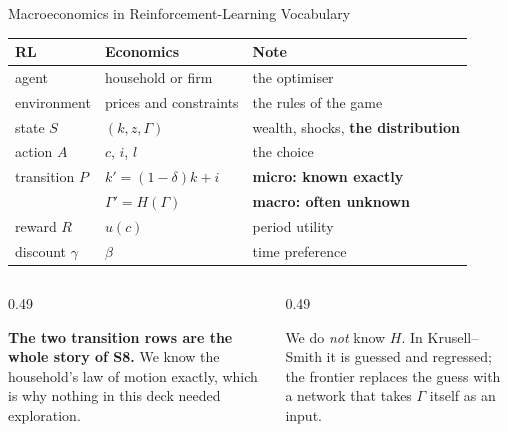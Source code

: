 \begin{frame}{Macroeconomics in Reinforcement-Learning Vocabulary}
\vspace{-1mm}
\begin{center}\footnotesize
\begin{tabularx}{\linewidth}{@{}>{\raggedright\arraybackslash}p{2.4cm} >{\raggedright\arraybackslash}p{3.4cm} >{\raggedright\arraybackslash}X@{}}
\toprule
\textbf{RL} & \textbf{Economics} & \textbf{Note} \\
\midrule
agent & household or firm & the optimiser \\
environment & prices and constraints & the rules of the game \\
state $S$ & $(k,z,\Gamma)$ & wealth, shocks, \textbf{the distribution} \\
action $A$ & $c$, $i$, $l$ & the choice \\
transition $P$ & $k'=(1-\delta)k+i$ & \textbf{micro: known exactly} \\
 & $\Gamma'=H(\Gamma)$ & \textbf{macro: often unknown} \\
reward $R$ & $u(c)$ & period utility \\
discount $\gamma$ & $\beta$ & time preference \\
\bottomrule
\end{tabularx}
\end{center}
\medskip
\begin{columns}[T]
\begin{column}{0.49\textwidth}
\begin{takeawaybox}\footnotesize
\textbf{The two transition rows are the whole story of S8.} We know the household's law of motion exactly, which is why nothing in this deck needed exploration.
\end{takeawaybox}
\end{column}
\begin{column}{0.49\textwidth}
\begin{cautionbox}\footnotesize
We do \emph{not} know $H$. In Krusell--Smith it is guessed and regressed; the frontier replaces the guess with a network that takes $\Gamma$ itself as an input.
\end{cautionbox}
\end{column}
\end{columns}
\vspace{1mm}
\end{frame}

